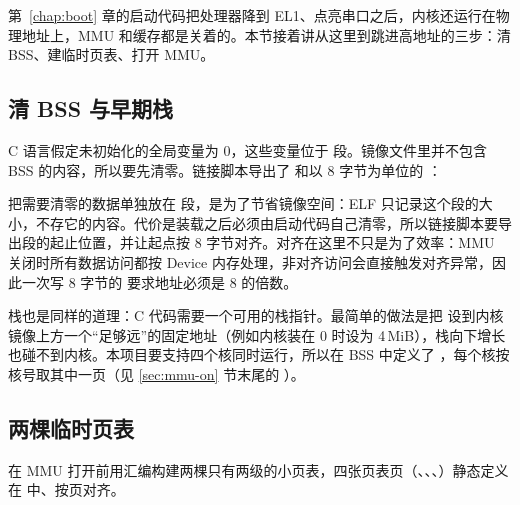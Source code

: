 第~\ref{chap:boot} 章的启动代码把处理器降到 EL1、点亮串口之后，内核还运行在物理地址上，MMU 和缓存都是关着的。本节接着讲从这里到跳进高地址的三步：清 BSS、建临时页表、打开 MMU。

\subsection{清 BSS 与早期栈}

C 语言假定未初始化的全局变量为 0，这些变量位于  段。镜像文件里并不包含 BSS 的内容，所以要先清零。链接脚本导出了  和以 8 字节为单位的 ：


把需要清零的数据单独放在  段，是为了节省镜像空间：ELF 只记录这个段的大小，不存它的内容。代价是装载之后必须由启动代码自己清零，所以链接脚本要导出段的起止位置，并让起点按 8 字节对齐。对齐在这里不只是为了效率：MMU 关闭时所有数据访问都按 Device 内存处理，非对齐访问会直接触发对齐异常，因此一次写 8 字节的  要求地址必须是 8 的倍数。

栈也是同样的道理：C 代码需要一个可用的栈指针。最简单的做法是把  设到内核镜像上方一个“足够远”的固定地址（例如内核装在 0 时设为 4\,MiB），栈向下增长也碰不到内核。本项目要支持四个核同时运行，所以在 BSS 中定义了 ，每个核按核号取其中一页（见 \ref{sec:mmu-on} 节末尾的 ）。

\subsection{两棵临时页表}


 在 MMU 打开前用汇编构建两棵只有两级的小页表，四张页表页（、、、）静态定义在  中、按页对齐。

